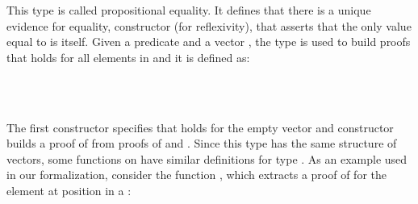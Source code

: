 \documentclass[sigconf]{acmart}
\begin{document}
This type is called propositional equality. It defines that there is
a unique evidence for equality, constructor  (for reflexivity),
that asserts that the only value equal to  is itself.
Given a predicate  and a vector , the
type  is used to build proofs that  holds for all
elements in  and it is defined as:
\begin{code}%
%
\>[2]\AgdaSpace{}%
\AgdaSpace{}%
\AgdaSymbol{\{}\AgdaSpace{}%
\AgdaSymbol{\}(}\AgdaSpace{}%
\AgdaSymbol{:}\AgdaSpace{}%
\AgdaSpace{}%
\AgdaSpace{}%
\AgdaSymbol{)}\AgdaSpace{}%
\AgdaSymbol{:}\AgdaSpace{}%
\AgdaSpace{}%
\AgdaSpace{}%
\AgdaSpace{}%
%
\>[43]\AgdaSpace{}%
\<%
\\
\>[2][@{}l@{\AgdaIndent{0}}]%
\>[5]\AgdaInductiveConstructor{[]}\AgdaSpace{}%
\AgdaSymbol{:}\AgdaSpace{}%
\AgdaSpace{}%
\AgdaSpace{}%
\AgdaInductiveConstructor{[]}\<%
\\
%
\>[5]\AgdaSpace{}%
\AgdaSymbol{:}\AgdaSpace{}%
\AgdaSpace{}%
\AgdaSymbol{\{}\AgdaSpace{}%
\AgdaSymbol{\}}\AgdaSpace{}%
\AgdaSpace{}%
\AgdaSpace{}%
\AgdaSpace{}%
\AgdaSpace{}%
\AgdaSpace{}%
\AgdaSpace{}%
\AgdaSpace{}%
\AgdaSpace{}%
\AgdaSpace{}%
\AgdaSpace{}%
\AgdaSymbol{(}\AgdaSpace{}%
\AgdaSpace{}%
\AgdaSymbol{)}\<%
\end{code}
The first constructor specifies that  holds for the empty vector and
constructor  builds a proof of  from proofs of
 and . Since this type has the same structure of vectors,
some functions on  have similar definitions for type . As an example
used in our formalization, consider the function , which extracts a
proof of  for the element at position  in a :
\end{document}
